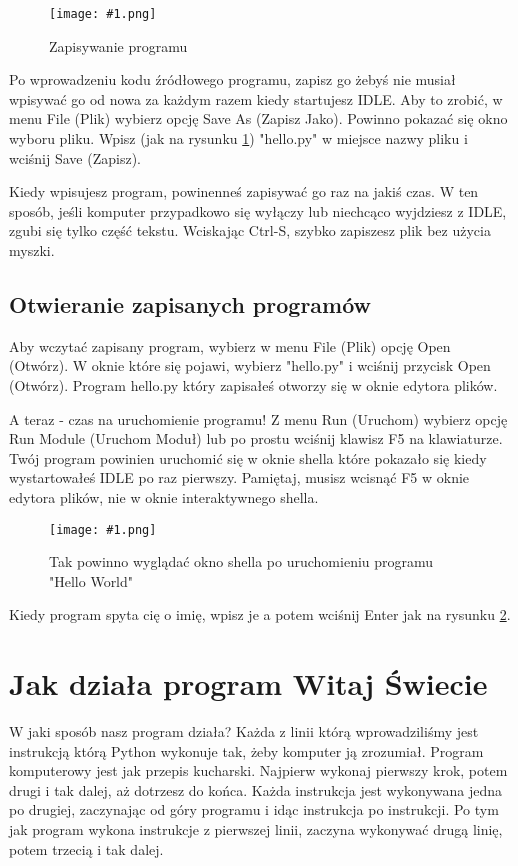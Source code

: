 \documentclass{book}
\newcommand{\img}[3]{
\begin{figure}
\centerline{
	\texttt{[image: \#1.png]}
}
\caption{#2}
\label{#1}
\end{figure}
}
\begin{document}
\img{strings-saveas}{Zapisywanie programu}{7cm}

Po wprowadzeniu kodu źródłowego programu, zapisz go żebyś nie musiał wpisywać go od nowa za każdym razem kiedy startujesz IDLE. Aby to zrobić, w menu File (Plik) wybierz opcję Save As (Zapisz Jako). Powinno pokazać się okno wyboru pliku. Wpisz (jak na rysunku \ref{strings-saveas}) "hello.py" w miejsce nazwy pliku i wciśnij Save (Zapisz).

Kiedy wpisujesz program, powinenneś zapisywać go raz na jakiś czas. W ten sposób, jeśli komputer przypadkowo się wyłączy lub niechcąco wyjdziesz z IDLE, zgubi się tylko część tekstu. Wciskając Ctrl-S, szybko zapiszesz plik bez użycia myszki.


\subsection{Otwieranie zapisanych programów}

Aby wczytać zapisany program, wybierz w menu File (Plik) opcję Open (Otwórz). W oknie które się pojawi, wybierz "hello.py" i wciśnij przycisk Open (Otwórz). Program hello.py który zapisałeś otworzy się w oknie edytora plików.

A teraz - czas na uruchomienie programu! Z menu Run (Uruchom) wybierz opcję Run Module (Uruchom Moduł) lub po prostu wciśnij klawisz F5 na klawiaturze. Twój program powinien uruchomić się w oknie shella które pokazało się kiedy wystartowałeś IDLE po raz pierwszy. Pamiętaj, musisz wcisnąć F5 w oknie edytora plików, nie w oknie interaktywnego shella.

\img{strings-hello}{Tak powinno wyglądać okno shella po uruchomieniu programu "Hello World"}{7cm}

Kiedy program spyta cię o imię, wpisz je a potem wciśnij Enter jak na rysunku \ref{strings-hello}.

\section{Jak działa program Witaj Świecie}

W jaki sposób nasz program działa? Każda z linii którą wprowadziliśmy jest instrukcją którą Python wykonuje tak, żeby komputer ją zrozumiał. Program komputerowy jest jak przepis kucharski. Najpierw wykonaj pierwszy krok, potem drugi i tak dalej, aż dotrzesz do końca. Każda instrukcja jest wykonywana jedna po drugiej, zaczynając od góry programu i idąc instrukcja po instrukcji. Po tym jak program wykona instrukcje z pierwszej linii, zaczyna wykonywać drugą linię, potem trzecią i tak dalej.
\end{document}
